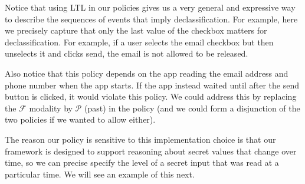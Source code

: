 \documentclass[10pt,conference,compsocconf]{IEEEtran}
\newcommand{\code}[1]{\text{\lstinline!#1!}}
\newcommand{\tfuture}{\mathcal{F}}
\newcommand{\tpast}{\mathcal{P}}
\begin{document}
Notice that using LTL in our policies gives us a very general and
expressive way to describe the sequences of events that imply
declassification. For example, here we precisely capture that
only the last value of the checkbox matters for declassification. For
example, if a user selects the email checkbox but then unselects it
and clicks send, the email is not allowed to be released.

Also notice that this policy depends on the app reading the email
address and phone number when the app starts. If the app instead
waited until after the send button is clicked, it would violate this
policy. We could address this by replacing the $\tfuture$ modality by
$\tpast$ (past) in the policy (and we could form a disjunction of the
two policies if we wanted to allow either).

The reason our policy is sensitive to this implementation choice is
that our framework is designed to support reasoning about secret
values that change over time, so we can precise specify the level of a
secret input that was read at a particular time. We will see an
example of this next.


\end{document}
